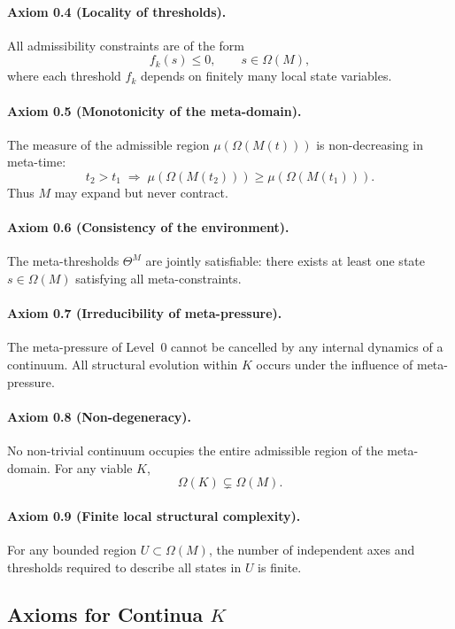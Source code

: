 \paragraph{Axiom 0.4 (Locality of thresholds).}
All admissibility constraints are of the form
\[
  f_k(s)\le 0,\qquad s\in \Omega(M),
\]
where each threshold \(f_k\) depends on finitely many local state variables.

\paragraph{Axiom 0.5 (Monotonicity of the meta-domain).}
The measure of the admissible region \(\mu(\Omega(M(t)))\) is non-decreasing in meta-time:
\[
  t_2>t_1 \;\Rightarrow\; \mu(\Omega(M(t_2)))\ge \mu(\Omega(M(t_1))).
\]
Thus \(M\) may expand but never contract.

\paragraph{Axiom 0.6 (Consistency of the environment).}
The meta-thresholds \(\Theta^M\) are jointly satisfiable: there exists at least one state \(s\in\Omega(M)\) satisfying all meta-constraints.

\paragraph{Axiom 0.7 (Irreducibility of meta-pressure).}
The meta-pressure of Level~0 cannot be cancelled by any internal dynamics of a continuum.
All structural evolution within \(K\) occurs under the influence of meta-pressure.

\paragraph{Axiom 0.8 (Non-degeneracy).}
No non-trivial continuum occupies the entire admissible region of the meta-domain.
For any viable \(K\),
\[
  \Omega(K)\subsetneq \Omega(M).
\]

\paragraph{Axiom 0.9 (Finite local structural complexity).}
For any bounded region \(U\subset \Omega(M)\), the number of independent axes and thresholds required to describe all states in \(U\) is finite.

\subsection{Axioms for Continua \texorpdfstring{\(K\)}{K}}

